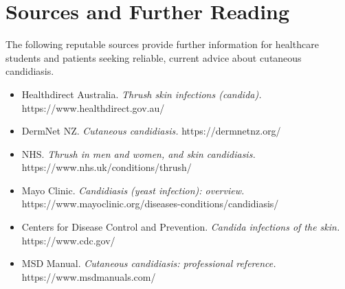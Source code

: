 \section*{Sources and Further Reading}
The following reputable sources provide further information for healthcare students and patients seeking reliable, current advice about cutaneous candidiasis.

\begin{itemize}
    \item Healthdirect Australia. \textit{Thrush skin infections (candida).} https://www.healthdirect.gov.au/
    \item DermNet NZ. \textit{Cutaneous candidiasis.} https://dermnetnz.org/
    \item NHS. \textit{Thrush in men and women, and skin candidiasis.} https://www.nhs.uk/conditions/thrush/
    \item Mayo Clinic. \textit{Candidiasis (yeast infection): overview.} https://www.mayoclinic.org/diseases-conditions/candidiasis/
    \item Centers for Disease Control and Prevention. \textit{Candida infections of the skin.} https://www.cdc.gov/
    \item MSD Manual. \textit{Cutaneous candidiasis: professional reference.} https://www.msdmanuals.com/
\end{itemize}
